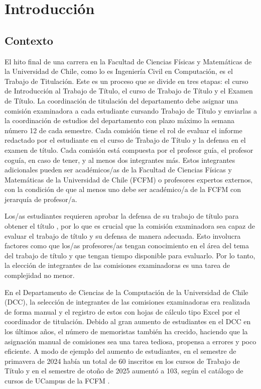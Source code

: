 \chapter{Introducción}

\section{Contexto}
El hito final de una carrera en la Facultad de Ciencias Físicas y Matemáticas de la
Universidad de Chile, como lo es Ingeniería Civil en Computación, es el Trabajo de
Titulación. Este es un proceso que se divide en tres etapas: el curso de Introducción al
Trabajo de Título, el curso de Trabajo de Título y el Examen de Título. La coordinación
de titulación del departamento debe asignar una comisión examinadora a cada estudiante
cursando Trabajo de Título y enviarlas a la coordinación de estudios del departamento con
plazo máximo la semana número 12 de cada semestre. Cada comisión tiene el rol de evaluar
el informe redactado por el estudiante en el curso de Trabajo de Título y la defensa en el
examen de título. Cada comisión está compuesta por el profesor guía, el profesor coguía,
en caso de tener, y al menos dos integrantes más. Estos integrantes adicionales pueden
ser académicos/as de la Facultad de Ciencias Físicas
y Matemáticas de la Universidad de Chile (FCFM) o profesores expertos externos, con la
condición de que al menos uno debe ser académico/a de la FCFM con jerarquía de
profesor/a. \cite[p.~17]{ReglamentoEstudios}

Los/as estudiantes requieren aprobar la defensa de su trabajo de título para obtener el
título \cite[pp.~15-16]{ReglamentoEstudios}, por lo que es crucial que la comisión
examinadora sea capaz de evaluar el trabajo de título y su defensa de manera adecuada.
Esto involucra factores como que los/as profesores/as tengan conocimiento en el área del
tema del trabajo de título y que tengan tiempo disponible para evaluarlo. Por lo tanto,
la elección de integrantes de las comisiones examinadoras es una tarea de complejidad
no menor.

En el Departamento de Ciencias de la Computación de la Universidad de Chile (DCC), la
selección de integrantes de las comisiones examinadoras era realizada de forma manual y el
registro de estos con hojas de cálculo tipo Excel por el coordinador de titulación. Debido al
gran aumento de estudiantes en el DCC en los últimos años, el número de memoristas también
ha crecido, haciendo que la asignación manual de comisiones sea una tarea tediosa,
propensa a errores y poco eficiente. A modo de ejemplo del aumento de estudiantes, en el
semestre de primavera de 2024 había un total de 60 inscritos en los cursos de Trabajo de
Título y en el semestre de otoño de 2025 aumentó a 103, según el catálogo de cursos de
UCampus de la FCFM \cite{EstudiantesTrabajoTitulo20242,EstudiantesTrabajoTitulo20251}.

